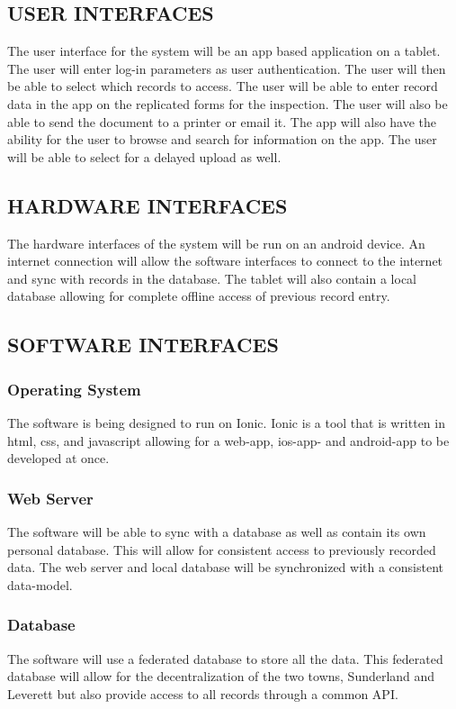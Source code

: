 \documentclass[twoside,letterpaper]{article}
\begin{document}
\subsection[USER INTERFACES]{\rmfamily\bfseries\color{black}
USER INTERFACES}
{\rmfamily\color{black}
The user interface for the system will be an app based application on a tablet. The user will enter log-in parameters as user authentication. The user will then be able to select which records to access. The user will be able to enter record data in the app on the replicated forms for the inspection. The user will also be able to send the document to a printer or email it. The app will also have the ability for the user to browse and search for information on the app. The user will be able to select for a delayed upload as well.}

\subsection[HARDWARE INTERFACES]{\rmfamily\bfseries\color{black}
HARDWARE INTERFACES}
{\rmfamily\color{black}
  The hardware interfaces of the system will be run on an android device. An internet connection will allow the software interfaces to connect to the internet and sync with records in the database. The tablet will also contain a local database allowing for complete offline access of previous record entry.  }

\subsection[SOFTWARE INTERFACES]{\rmfamily\bfseries\color{black}
SOFTWARE INTERFACES}
{\rmfamily\color{black}
\subsubsection{Operating System} 
The software is being designed to run on Ionic. Ionic is a tool that is written in html, css, and javascript allowing for a web-app, ios-app- and android-app to be developed at once.
\subsubsection{Web Server}
The software will be able to sync with a database as well as contain its own personal database. This will allow for consistent access to previously recorded data. The web server and local database will be synchronized with a consistent data-model. 
\subsubsection{Database}
The software will use a federated database to store all the data. This federated database will allow for the decentralization of the two towns, Sunderland and Leverett but also provide access to all records through a common API. }
\end{document}
